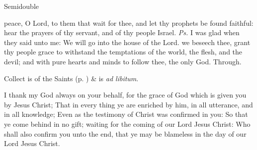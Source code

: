 \begin{inhead}
{Semidouble}
\end{inhead}
\par\noindent
{}




\properantiphonfix

\introit
{} peace, O Lord, to them that wait for thee, and let thy prophets be found faithful: hear the prayers of thy servant, and of thy people Israel. \textit{Ps.} I was glad when they said unto me: We will go into the house of the Lord.
\collect
{} we beseech thee, grant thy people grace to withstand the temptations of the world, the flesh, and the devil; and with pure hearts and minds to follow thee, the only God. Through.
\begin{rubric}
     Collect is of the Saints (p. \pageref{SPSaints}) \&  is \emph{ad libitum}.
\end{rubric}

 I thank my God always on your behalf, for the grace of God which is given you by Jesus Christ; That in every thing ye are enriched by him, in all utterance, and in all knowledge; Even as the testimony of Christ was confirmed in you: So that ye come behind in no gift; waiting for the coming of our Lord Jesus Christ: Who shall also confirm you unto the end, that ye may be blameless in the day of our Lord Jesus Christ.




